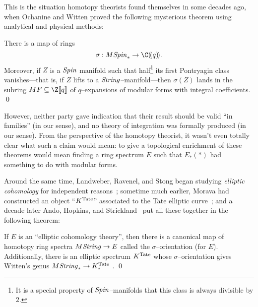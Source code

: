 This is the situation homotopy theorists found themselves in some decades ago, when Ochanine and Witten proved the following mysterious theorem using analytical and physical methods:

\begin{theorem}\label{OchanineWittenTheorem}
There is a map of rings \[\sigma: M\Spin_* \to \C(\!(q)\!).\]  Moreover, if \(Z\) is a \(\mathit{Spin}\) manifold such that half\footnote{It is a special property of \(\mathit{Spin}\)--manifolds that this class is always divisible by \(2\).} its first Pontryagin class vanishes---that is, if \(Z\) lifts to a \(\mathit{String}\)--manifold---then \(\sigma(Z)\) lands in the subring \(MF \subseteq \Z\ps{q}\) of \(q\)--expansions of modular forms with integral coefficients. \qed
\end{theorem}

\noindent However, neither party gave indication that their result should be valid ``in families'' (in our sense), and no theory of integration was formally produced (in our sense).  From the perspective of the homotopy theorist, it wasn't even totally clear what such a claim would mean: to give a topological enrichment of these theorems would mean finding a ring spectrum \(E\) such that \(E_*(*)\) had something to do with modular forms.

Around the same time, Landweber, Ravenel, and Stong began studying \textit{elliptic cohomology} for independent reasons~\cite{LRS}; sometime much earlier, Morava had constructed an object ``\(K^{\mathrm{Tate}}\)'' associated to the Tate elliptic curve~\cite[Section 5]{MoravaFormsOfKthy}; and a decade later Ando, Hopkins, and Strickland~\cite{AHSTheoremOfTheCube} put all these together in the following theorem:

\begin{theorem}
If \(E\) is an ``elliptic cohomology theory'', then there is a canonical map of homotopy ring spectra \(M\mathit{String} \to E\) called the \(\sigma\)--orientation (for \(E\)).  Additionally, there is an elliptic spectrum \(K^{\mathrm{Tate}}\) whose \(\sigma\)--orientation gives Witten's genus \(M\mathit{String}_* \to K^{\mathrm{Tate}}_*\) . \qed
\end{theorem}

